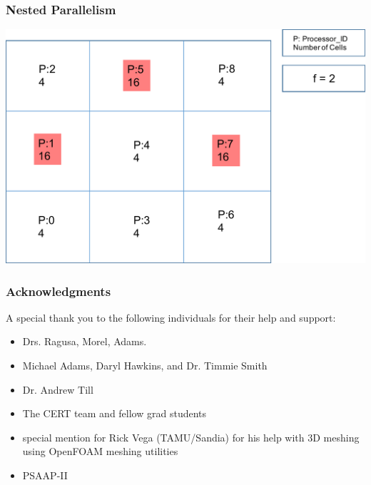 \documentclass[compress]{beamer}
\begin{document}
\begin{frame}[t]\frametitle{Nested Parallelism}
\centering
\includegraphics[scale=0.5]{figures/initial_setup.pdf}
\end{frame}

\begin{frame}[t]\frametitle{Acknowledgments}
\begin{block}{}
A special thank you to the following individuals for their help and support:
\begin{itemize}
\item Drs. Ragusa, Morel, Adams.
\item Michael Adams, Daryl Hawkins, and Dr. Timmie Smith
\item Dr. Andrew Till
\item The CERT team and fellow grad students 
\item special mention for Rick Vega (TAMU/Sandia) for his help with 3D meshing using OpenFOAM meshing utilities
\item PSAAP-II 
\end{itemize}
\end{block}
\end{frame}

%
%



%	
%	
%	
%	
%
\end{document}
